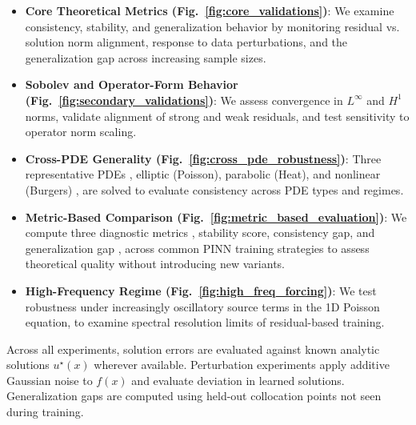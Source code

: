 \documentclass[11pt, a4paper]{article}
\begin{document}
\begin{itemize}
    \item \textbf{Core Theoretical Metrics (Fig.~\ref{fig:core_validations})}: We examine consistency, stability, and generalization behavior by monitoring residual vs. solution norm alignment, response to data perturbations, and the generalization gap across increasing sample sizes.
    
    \item \textbf{Sobolev and Operator-Form Behavior (Fig.~\ref{fig:secondary_validations})}: We assess convergence in $L^\infty$ and $H^1$ norms, validate alignment of strong and weak residuals, and test sensitivity to operator norm scaling.

    \item \textbf{Cross-PDE Generality (Fig.~\ref{fig:cross_pde_robustness})}: Three representative PDEs ,  elliptic (Poisson), parabolic (Heat), and nonlinear (Burgers) ,  are solved to evaluate consistency across PDE types and regimes.

    \item \textbf{Metric-Based Comparison (Fig.~\ref{fig:metric_based_evaluation})}: We compute three diagnostic metrics ,  stability score, consistency gap, and generalization gap ,  across common PINN training strategies to assess theoretical quality without introducing new variants.

    \item \textbf{High-Frequency Regime (Fig.~\ref{fig:high_freq_forcing})}: We test robustness under increasingly oscillatory source terms in the 1D Poisson equation, to examine spectral resolution limits of residual-based training.

\end{itemize}

Across all experiments, solution errors are evaluated against known analytic solutions $u^\star(x)$ wherever available. Perturbation experiments apply additive Gaussian noise to $f(x)$ and evaluate deviation in learned solutions. Generalization gaps are computed using held-out collocation points not seen during training.
\end{document}
